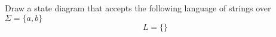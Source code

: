 Draw a state diagram that accepts the following
language of strings over $\Sigma =
\{ a, b \}$ 
\[
L = \{\}
\]
